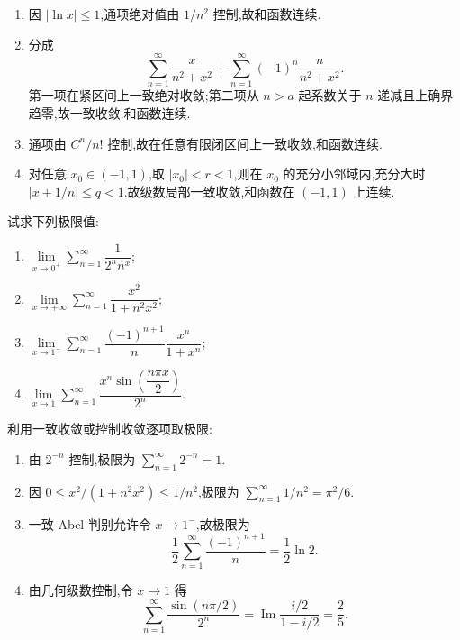 \begin{solution}
    \begin{enumerate}
        \item 因 $|\ln x|\leq1$,通项绝对值由 $1/n^2$ 控制,故和函数连续.
        \item 分成
              \[
                  \sum\limits_{n=1}^{\infty}\dfrac{x}{n^2+x^2}
                  +\sum\limits_{n=1}^{\infty}(-1)^n\dfrac{n}{n^2+x^2}.
              \]
              第一项在紧区间上一致绝对收敛;第二项从 $n>a$ 起系数关于 $n$ 递减且上确界趋零,故一致收敛.和函数连续.
        \item 通项由 $C^n/n!$ 控制,故在任意有限闭区间上一致收敛,和函数连续.
        \item 对任意 $x_0\in(-1,1)$,取 $|x_0|<r<1$,则在 $x_0$ 的充分小邻域内,充分大时 $|x+1/n|\leq q<1$.故级数局部一致收敛,和函数在 $(-1,1)$ 上连续.
    \end{enumerate}
\end{solution}

\begin{example}
    试求下列极限值:
    \begin{enumerate}
        \item $\displaystyle\lim\limits_{x\to0^+}\sum\limits_{n=1}^{\infty}\dfrac{1}{2^n n^x}$;
        \item $\displaystyle\lim\limits_{x\to+\infty}\sum\limits_{n=1}^{\infty}\dfrac{x^2}{1+n^2x^2}$;
        \item $\displaystyle\lim\limits_{x\to1^-}\sum\limits_{n=1}^{\infty}\dfrac{(-1)^{n+1}}{n}\dfrac{x^n}{1+x^n}$;
        \item $\displaystyle\lim\limits_{x\to1}\sum\limits_{n=1}^{\infty}\dfrac{x^n\sin\left(\dfrac{n\pi x}{2}\right)}{2^n}$.
    \end{enumerate}
\end{example}
\exampleblank

\begin{solution}
    利用一致收敛或控制收敛逐项取极限:
    \begin{enumerate}
        \item 由 $2^{-n}$ 控制,极限为 $\sum_{n=1}^{\infty}2^{-n}=\boxed1$.
        \item 因 $0\leq x^2/(1+n^2x^2)\leq1/n^2$,极限为
              $\sum_{n=1}^{\infty}1/n^2=\boxed{\pi^2/6}$.
        \item 一致 Abel 判别允许令 $x\to1^-$,故极限为
              \[
                  \dfrac{1}{2}\sum\limits_{n=1}^{\infty}\dfrac{(-1)^{n+1}}n
                  =\boxed{\dfrac{1}{2}\ln2}.
              \]
        \item 由几何级数控制,令 $x\to1$ 得
              \[
                  \sum\limits_{n=1}^{\infty}\dfrac{\sin(n\pi/2)}{2^n}
                  =\operatorname{Im}\dfrac{i/2}{1-i/2}
                  =\boxed{\dfrac{2}{5}}.
              \]
    \end{enumerate}
\end{solution}

